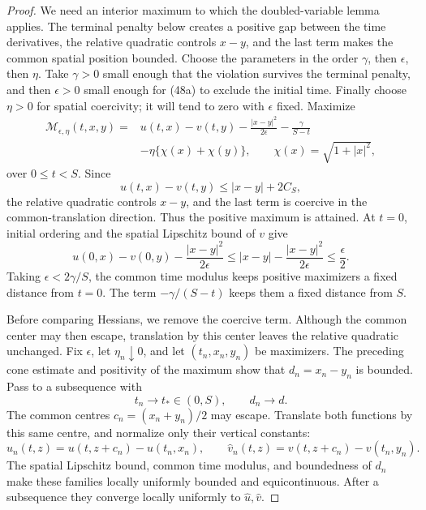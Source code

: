 \documentclass{smfart}
\theoremstyle{definition}
\newcommand{\1}{\mathbf 1}
\begin{document}
\begin{proof}
We need an interior maximum to which the doubled-variable lemma
applies.  The terminal penalty below creates a positive gap between
the time derivatives, the relative quadratic controls $x-y$, and the
last term makes the common spatial position bounded.
Choose the parameters in the order $\gamma$, then $\epsilon$, then
$\eta$.  Take $\gamma>0$ small enough that the violation survives
the terminal penalty, and then $\epsilon>0$ small enough for (48a)
to exclude the initial time.  Finally choose $\eta>0$ for spatial
coercivity; it will tend to zero with $\epsilon$ fixed.  Maximize
\begin{equation}
\begin{split}
\mathcal M_ {\epsilon,\eta}(t,x,y)
={}&u(t,x)-v(t,y)-\frac{|x-y|^2}{2\epsilon}
-\frac{\gamma}{S-t}\\
&-\eta\{\chi(x)+\chi(y)\},\qquad
\chi(x)=\sqrt{1+|x|^2},                                  
\end{split}
\tag{48}
\end{equation}
over $0\leq t<S$.  Since
\begin{equation*}
u(t,x)-v(t,y)\leq |x-y|+2C_ S,
\end{equation*}
the relative quadratic controls $x-y$, and the last term is
coercive in the common-translation direction.  Thus the positive
maximum is attained.  At $t=0$, initial ordering and the spatial
Lipschitz bound of $v$ give
\begin{equation}
u(0,x)-v(0,y)-\frac{|x-y|^2}{2\epsilon}
\leq |x-y|-\frac{|x-y|^2}{2\epsilon}\leq\frac\epsilon2.
\tag{48a}
\end{equation}
Taking $\epsilon<2\gamma/S$, the common time modulus keeps positive
maximizers a fixed distance from $t=0$.  The term
$-\gamma/(S-t)$ keeps them a fixed distance from $S$.

Before comparing Hessians, we remove the coercive term.  Although
the common center may then escape, translation by this center leaves
the relative quadratic unchanged.  Fix $\epsilon$, let
$\eta_n\downarrow0$, and let
$(t_ n,x_ n,y_ n)$ be maximizers.  The preceding cone estimate and
positivity of the maximum show that $d_ n=x_ n-y_ n$ is bounded.  Pass
to a subsequence with
\begin{equation*}
t_ n\to t_ *\in(0,S),\qquad d_ n\to d.
\end{equation*}
The common centres $c_ n=(x_ n+y_ n)/2$ may escape.  Translate both
functions by this same centre, and normalize only their vertical
constants:
\begin{equation}
\widehat u_ n(t,z)=u(t,z+c_ n)-u(t_ n,x_ n),\qquad
\widehat v_ n(t,z)=v(t,z+c_ n)-v(t_ n,y_ n).
\tag{48b}
\end{equation}
The spatial Lipschitz bound, common time modulus, and boundedness of
$d_ n$ make these families locally uniformly bounded and
equicontinuous.  After a subsequence they converge locally uniformly
to $\widehat u,\widehat v$.


\end{proof}
\end{document}
